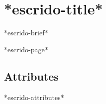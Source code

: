 \section{*escrido-title*}%
\label{*escrido-ident*}%

*escrido-brief*

*escrido-page*

\subsection{Attributes}
*escrido-attributes*
